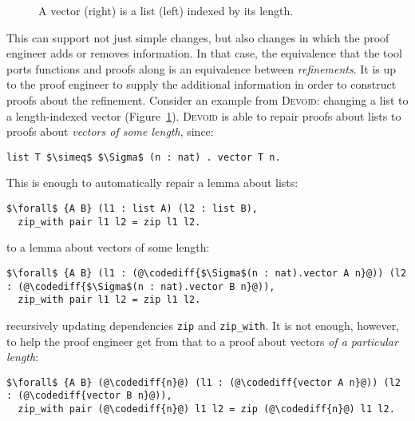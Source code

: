 \begin{figure}
\begin{minipage}{0.40\textwidth}
   
\end{minipage}
\hfill
\begin{minipage}{0.58\textwidth}
   
\end{minipage}
\caption{A vector (right) is a list (left) indexed by its length.}
\label{fig:listtovect}
\end{figure}

This can support not just simple changes, but also changes in which the proof engineer adds or removes information.
In that case, the equivalence that the tool ports functions and proofs along
is an equivalence between \textit{refinements}.
It is up to the proof engineer to supply the additional information in order to construct proofs about the refinement.
Consider an example from \textsc{Devoid}: changing a list to a length-indexed vector (Figure~\ref{fig:listtovect}).
\textsc{Devoid} is able to repair proofs about lists to proofs about \textit{vectors of some length}, since:

\begin{lstlisting}
list T $\simeq$ $\Sigma$ (n : nat) . vector T n.
\end{lstlisting}
This is enough to automatically repair a lemma about lists:

\begin{lstlisting}
$\forall$ {A B} (l1 : list A) (l2 : list B),
  zip_with pair l1 l2 = zip l1 l2.
\end{lstlisting}
to a lemma about vectors of some length:

\begin{lstlisting}
$\forall$ {A B} (l1 : (@\codediff{$\Sigma$(n : nat).vector A n}@)) (l2 : (@\codediff{$\Sigma$(n : nat).vector B n}@)),
  zip_with pair l1 l2 = zip l1 l2.
\end{lstlisting}
recursively updating dependencies \lstinline{zip} and \lstinline{zip_with}.
It is not enough, however, to help the proof engineer get from that to a proof about vectors \textit{of a particular length}:

\begin{lstlisting}
$\forall$ {A B} (@\codediff{n}@) (l1 : (@\codediff{vector A n}@)) (l2 : (@\codediff{vector B n}@)),
  zip_with pair (@\codediff{n}@) l1 l2 = zip (@\codediff{n}@) l1 l2.
\end{lstlisting}

